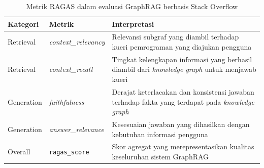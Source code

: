 \begin{table}[!htbp]
\centering
\caption{Metrik RAGAS dalam evaluasi GraphRAG berbasis Stack Overflow}
\label{tab:ragas_metrics}
\small
\begin{tabular}{|p{2.8cm}|p{3.5cm}|p{7.2cm}|}
\hline
\textbf{Kategori} & \textbf{Metrik} & \textbf{Interpretasi} \\
\hline
Retrieval &
\emph{context\_relevancy} &
Relevansi subgraf yang diambil terhadap kueri pemrograman yang diajukan pengguna \\
\hline
Retrieval &
\emph{context\_recall} &
Tingkat kelengkapan informasi yang berhasil diambil dari \emph{knowledge graph} untuk menjawab kueri \\
\hline
Generation &
\emph{faithfulness} &
Derajat keterlacakan dan konsistensi jawaban terhadap fakta yang terdapat pada \emph{knowledge graph} \\
\hline
Generation &
\emph{answer\_relevance} &
Kesesuaian jawaban yang dihasilkan dengan kebutuhan informasi pengguna \\
\hline
Overall &
\texttt{ragas\_score} &
Skor agregat yang merepresentasikan kualitas keseluruhan sistem GraphRAG \\
\hline
\end{tabular}
\end{table}